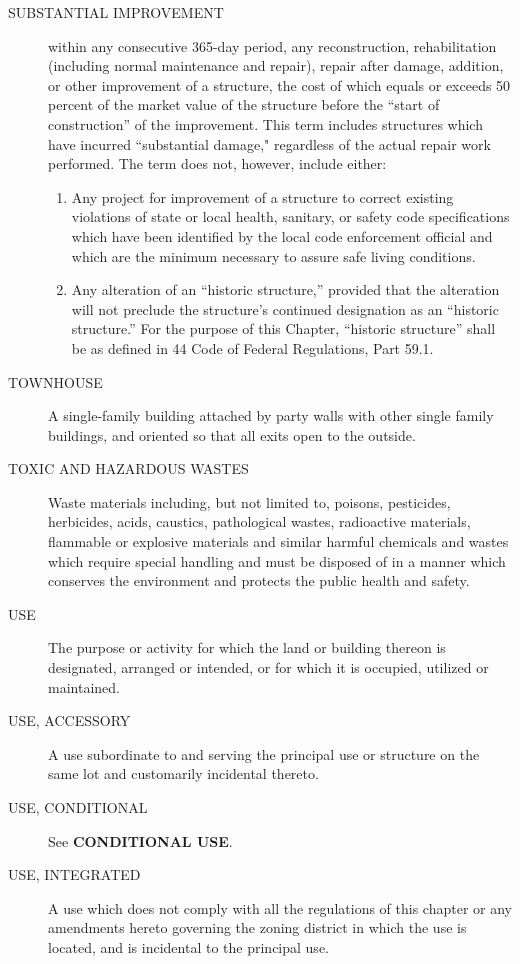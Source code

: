 \begin{description}
    \item[SUBSTANTIAL IMPROVEMENT] within any consecutive 365-day period, any reconstruction, rehabilitation (including normal maintenance and repair), repair after damage, addition, or other improvement of a structure, the cost of which equals or exceeds 50 percent of the market value of the structure before the “start of construction” of the improvement. This term includes structures which have incurred “substantial damage," regardless of the actual repair work performed. The term does not, however, include either:
        \begin{enumerate}[{\indent}a)]
            \item Any project for improvement of a structure to correct existing violations of state or local health, sanitary, or safety code specifications which have been identified by the local code enforcement official and which are the minimum necessary to assure safe living conditions.
            \item Any alteration of an “historic structure,” provided that the alteration will not preclude the structure’s continued designation as an “historic structure.” For the purpose of this Chapter, “historic structure” shall be as defined in 44 Code of Federal Regulations, Part 59.1.
        \end{enumerate}
    \item[TOWNHOUSE] A single-family building attached by party walls with other single family buildings, and oriented so that all exits open to the outside.
    \item[TOXIC AND HAZARDOUS WASTES] Waste materials including, but not limited to, poisons, pesticides, herbicides, acids, caustics, pathological wastes, radioactive materials, flammable or explosive materials and similar harmful chemicals and wastes which require special handling and must be disposed of in a manner which conserves the environment and protects the public health and safety.
    \item[USE] The purpose or activity for which the land or building thereon is designated, arranged or intended, or for which it is occupied, utilized or maintained.
    \item[USE, ACCESSORY] A use subordinate to and serving the principal use or structure on the same lot and customarily incidental thereto.
    \item[USE, CONDITIONAL] See \textbf{CONDITIONAL USE}.
    \item[USE, INTEGRATED] A use which does not comply with all the regulations of this chapter or any amendments hereto governing the zoning district in which the use is located, and is incidental to the principal use.

\end{description}
